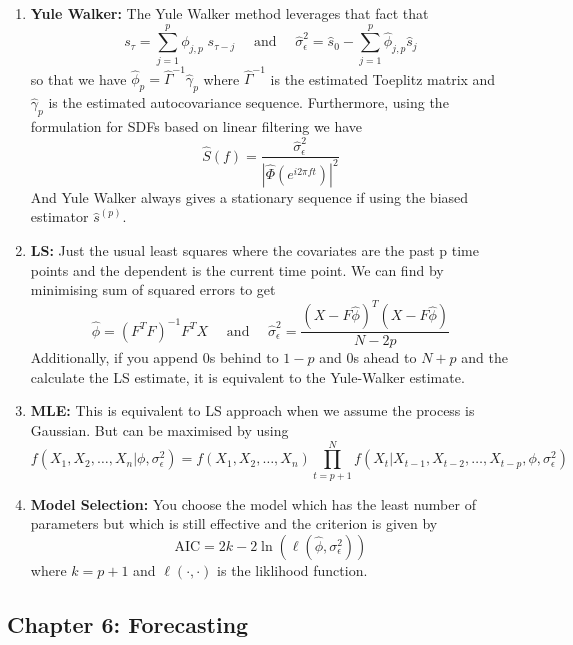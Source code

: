 \documentclass{article}
\begin{document}
\begin{enumerate}
    \item \textbf{Yule Walker:} The Yule Walker method leverages that fact that
    \[
    s_\tau = \sum_{j=1}^p \phi_{j,p}\;s_{\tau-j} \quad \text{ and } \quad     \hat \sigma_\epsilon^2 = \hat s_0 - \sum_{j=1}^{p} \hat \phi_{j,p} \hat s_j
    \]
    so that we have \(\hat\phi_p=\hat\Gamma^{-1}\hat\gamma_p\) where \(\hat\Gamma^{-1}\) is the estimated Toeplitz matrix and \(\hat\gamma_p\) is the estimated autocovariance sequence. Furthermore, using the formulation for SDFs based on linear filtering we have
    \[
    \hat S(f) = \frac{\hat \sigma_\epsilon^2}{\left|\hat\Phi(e^{i 2 \pi ft})\right|^2}
    \]
    And Yule Walker always gives a stationary sequence if using the biased estimator \(\hat s^{(p)}\).

    \item \textbf{LS:} Just the usual least squares where the covariates are the past p time points and the dependent is the current time point. We can find by minimising sum of squared errors to get
    \[
    \hat \phi = (F^TF)^{-1}F^TX \quad \text{ and } \quad \hat \sigma_\epsilon^2 = \frac{(X- F\hat \phi)^T(X - F \hat \phi)}{N-2p}
    \]
    Additionally, if you append 0s behind to \(1-p\) and 0s ahead to \(N+p\) and the calculate the LS estimate, it is equivalent to the Yule-Walker estimate.
    
    \item \textbf{MLE:} This is equivalent to LS approach when we assume the process is Gaussian. But can be maximised by using
    \[
    f(X_1, X_2, \dots, X_n|\phi, \sigma_\epsilon^2 ) = f(X_1, X_2, \dots, X_n)\prod_{t=p+1}^N f(X_t|X_{t-1}, X_{t-2}, \dots, X_{t-p}, \phi, \sigma_\epsilon^2)
    \]

    \item \textbf{Model Selection:} You choose the model which has the least number of parameters but which is still effective and the criterion is given by
    \[
    \text{AIC} = 2k -2\ln(\ell (\hat \phi, \sigma_\epsilon^2))
    \]
    where \(k = p+1\) and \(\ell(\cdot, \cdot)\) is the liklihood function. 
\end{enumerate}

\subsection*{Chapter 6: Forecasting}
\end{document}
